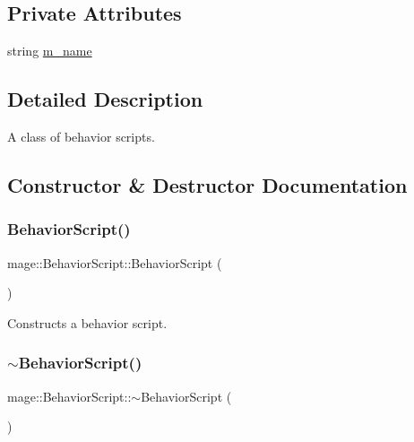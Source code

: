 \subsection*{Private Attributes}
\begin{DoxyCompactItemize}
\item 
string \hyperlink{classmage_1_1_behavior_script_a3e55dd6e720dc72c3f613b917e73344b}{m\+\_\+name}
\end{DoxyCompactItemize}


\subsection{Detailed Description}
A class of behavior scripts. 

\subsection{Constructor \& Destructor Documentation}
\hypertarget{classmage_1_1_behavior_script_a90ac6d3397f54ad95a931c9ef2c47549}{}\label{classmage_1_1_behavior_script_a90ac6d3397f54ad95a931c9ef2c47549} 
\subsubsection{\texorpdfstring{Behavior\+Script()}{BehaviorScript()}\hspace{0.1cm}{\footnotesize\ttfamily [1/2]}}
{\footnotesize\ttfamily mage\+::\+Behavior\+Script\+::\+Behavior\+Script (\begin{DoxyParamCaption}{ }\end{DoxyParamCaption})\hspace{0.3cm}{\ttfamily [default]}}

Constructs a behavior script. \hypertarget{classmage_1_1_behavior_script_a1cc4b4f909124615af4f49f2327c233e}{}\label{classmage_1_1_behavior_script_a1cc4b4f909124615af4f49f2327c233e} 
\subsubsection{\texorpdfstring{$\sim$\+Behavior\+Script()}{~BehaviorScript()}}
{\footnotesize\ttfamily mage\+::\+Behavior\+Script\+::$\sim$\+Behavior\+Script (\begin{DoxyParamCaption}{ }\end{DoxyParamCaption})\hspace{0.3cm}{\ttfamily [default]}}

